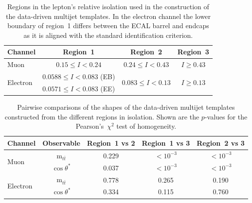\begin{table}
  \caption{Regions in the lepton's relative isolation used in the construction of the data-driven multijet templates. In the electron channel the lower boundary of region~1 differs between the ECAL barrel and endcaps as it is aligned with the standard identification criterion.}
  \centering
  \begin{tabular}{lccc}
    \hline
    \hline
    Channel  & Region~1  & Region~2  & Region~3  \\
    \hline
    Muon & $0.15 \leqslant I < 0.24$  & $0.24 \leqslant I < 0.43$  & $I \geqslant 0.43$ \\
    \multirow{2}{*}{Electron}  & $0.0588 \leqslant I < 0.083$ (EB)  & \multirow{2}{*}{$0.083 \leqslant I < 0.13$}  & \multirow{2}{*}{$I \geqslant 0.13$}  \\
     & $0.0571 \leqslant I < 0.083$ (EE) & & \\
    \hline
    \hline
  \end{tabular}
  \label{Tab:QCDShapeRegions}
\end{table}

\begin{table}
  \caption{Pairwise comparisons of the shapes of the data-driven multijet templates constructed from the different regions in isolation. Shown are the $p$-values for the Pearson's~$\chi^2$ test of homogeneity.}
  \centering
  \begin{tabular}{lcccc}
    \hline
    \hline
    Channel  & Observable  & Region~1 vs 2  & Region~1 vs 3  & Region~2 vs 3  \\
    \hline
    \multirow{2}{*}{Muon}  & m$_{t\bar t}$  & 0.229  & $< 10^{-3}$  & $< 10^{-3}$  \\
     & $\cos\theta^*$  & 0.037  & $< 10^{-3}$  & $< 10^{-3}$  \\
    \multirow{2}{*}{Electron}  & m$_{t\bar t}$  & 0.778  & 0.265  & 0.190  \\
     & $\cos\theta^*$  & 0.334  & 0.115  & 0.760  \\
    \hline
    \hline
  \end{tabular}
  \label{Tab:QCDShapeChi2}
\end{table}

